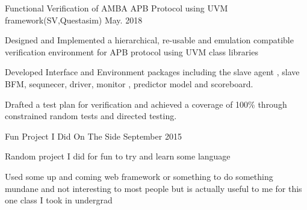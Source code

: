 \begin{cvprojects}
  \cvproject
    {Functional Verification of AMBA APB Protocol using UVM framework(SV,Questasim)} 
    {\color{darkgray}May. 2018}
    {
      \begin{cvprojectitems}
        \item {Designed and Implemented a hierarchical, re-usable and emulation compatible verification environment for APB protocol using UVM class libraries}
        \item {Developed Interface and Environment packages including the slave agent , slave BFM, sequnecer, driver, monitor , predictor model and scoreboard.}
        \item {Drafted a test plan for verification and achieved a coverage of 100\% through constrained random tests and directed testing. }
      \end{cvprojectitems}
    }
  \cvproject
    {Fun Project I Did On The Side}
    {September 2015}
    {
      \begin{cvprojectitems}
        \item {Random project I did for fun to try and learn some language}
        \item {Used some up and coming web framework or something to do something mundane and not interesting to most people but is actually useful to me for this one class I took in undergrad}
      \end{cvprojectitems}
    }
\end{cvprojects}